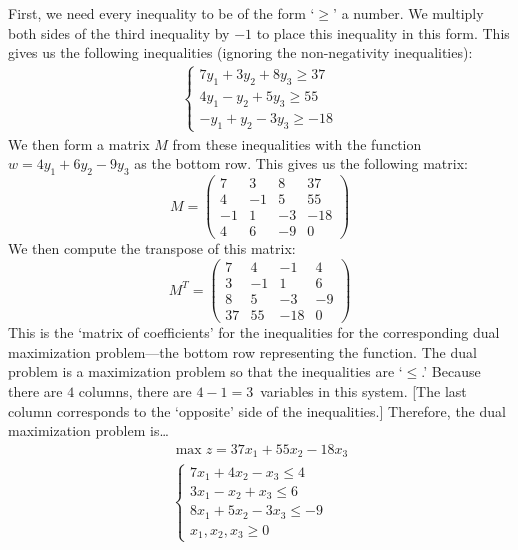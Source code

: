 \documentclass[11pt,letterpaper]{article}
\begin{document}
\sol First, we need every inequality to be of the form `$\geq$' a number. We multiply both sides of the third inequality by $-1$ to place this inequality in this form. This gives us the following inequalities (ignoring the non-negativity inequalities):
	\[
	\begin{gathered}
	\begin{cases}
	7y_1 + 3y_2 + 8y_3 \geq 37 \\
	4y_1 - y_2 + 5y_3 \geq 55 \\
	-y_1 + y_2 - 3y_3 \geq -18
	\end{cases}
	\end{gathered}
	\]
We then form a matrix $M$ from these inequalities with the function $w= 4y_1 + 6y_2 - 9y_3$ as the bottom row. This gives us the following matrix: 
	\[
	M=
	\begin{pmatrix}
	7 & 3 & 8 & 37 \\
	4 & -1 & 5 & 55 \\
	-1 & 1 & -3 & -18 \\
	4 & 6 & -9 & 0 
	\end{pmatrix}
	\]
We then compute the transpose of this matrix:
	\[
	M^T= 
	\begin{pmatrix}
	7 & 4 & -1 & 4 \\
	3 & -1 & 1 & 6 \\
	8 & 5 & -3 & -9 \\
	37 & 55 & -18 & 0 
	\end{pmatrix}
	\]
This is the `matrix of coefficients' for the inequalities for the corresponding dual maximization problem---the bottom row representing the function. The dual problem is a maximization problem so that the inequalities are `$\leq$.' Because there are $4$ columns, there are $4 - 1= 3$~variables in this system. [The last column corresponds to the `opposite' side of the inequalities.] Therefore, the dual maximization problem is\dots
	\[
	\begin{gathered}
	\max z= 37x_1 + 55x_2 - 18x_3 \\
	\begin{cases}
	7x_1 + 4x_2 - x_3 \leq 4 \\
	3x_1 - x_2 + x_3 \leq 6 \\
	8x_1 + 5x_2 - 3x_3 \leq -9 \\
	x_1, x_2, x_3 \geq 0
	\end{cases}
	\end{gathered}
	\] 
\end{document}
